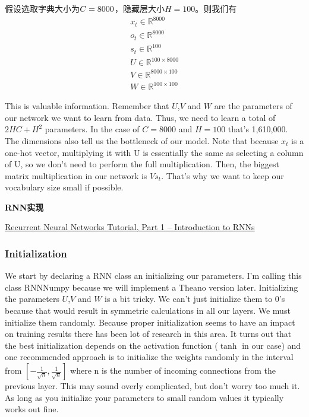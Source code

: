 \documentclass[10pt,a4paper]{ctexbook}
\begin{document}
假设选取字典大小为$\mathnormal{C}=8000$，隐藏层大小$H=100$。则我们有
\begin{gather*} 
x_{t} \in \mathbb{R}^{8000} \\
o_{t} \in \mathbb{R}^{8000} \\
s_{t} \in \mathbb{R}^{100} \\
U \in \mathbb{R}^{100 \times 8000} \\
V \in \mathbb{R}^{8000 \times 100} \\
W \in \mathbb{R}^{100 \times 100}
\end{gather*}

This is valuable information. Remember that $U$,$V$ and $W$ are the parameters of our network we want to learn from data. Thus, we need to learn a total of $2HC + H^{2}$ parameters. In the case of $C=8000$ and $H=100$ that's 1,610,000. The dimensions also tell us the bottleneck of our model. Note that because $x_{t}$ is a one-hot vector, multiplying it with U is essentially the same as selecting a column of U, so we don't need to perform the full multiplication. Then, the biggest matrix multiplication in our network is $Vs_{t}$. That's why we want to keep our vocabulary size small if possible.


\textbf{RNN实现}

\href{http://www.wildml.com/2015/09/recurrent-neural-networks-tutorial-part-1-introduction-to-rnns/}{Recurrent Neural Networks Tutorial, Part 1 – Introduction to RNNs}

\subsubsection{Initialization}
We start by declaring a RNN class an initializing our parameters. I'm calling this class RNNNumpy because we will implement a Theano version later. Initializing the parameters $U$,$V$ and $W$ is a bit tricky. We can't just initialize them to 0's because that would result in symmetric calculations in all our layers. We must initialize them randomly. Because proper initialization seems to have an impact on training results there has been lot of research in this area. It turns out that the best initialization depends on the activation function ($\tanh$ in our case) and one recommended approach is to initialize the weights randomly in the interval from $\left[-\frac{1}{\sqrt{n}}, \frac{1}{\sqrt{n}}\right]$ where n is the number of incoming connections from the previous layer. This may sound overly complicated, but don't worry too much it. As long as you initialize your parameters to small random values it typically works out fine.
\end{document}
